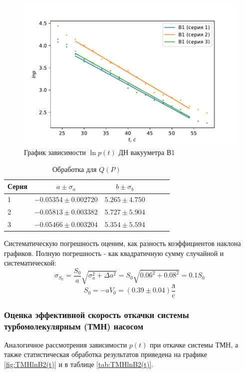 \documentclass[12pt,a4paper]{article}
\begin{document}
\begin{figure}[H]
	\centering
	\includegraphics[width = 11 cm]{res/lnB1(t).pdf}
	\caption{График зависимости $\ln{p}(t)$ ДН вакууметра В1}
	\label{fig:lnB1(t)}
\end{figure}
\begin{table}[H]
	
	\caption{Обработка для $Q(P)$}
	\label{tab:lnB1(t)_stat}
	\centering
	\footnotesize
	\begin{tabular}{lccccc}
		\toprule
		
		Серия & $a \pm \sigma_a$ & $b \pm \sigma_b$ \\
		\midrule
		1 & $-0.05354 \pm 0.002720$     &    $5.265 \pm 4.750$ \\ 
		2 & $-0.05813 \pm 0.003382$     &    $5.727 \pm 5.904$ \\
		3 & $-0.05466 \pm 0.003204$     &    $5.354 \pm 5.594$ \\ 
		\bottomrule
	\end{tabular}
\end{table}

Систематическую погрешность оценим, как разность коэффициентов наклона графиков. Полную погрешность - как квадратичную сумму случайной и систематической:
$$	\sigma_{S_0} = \frac{S_0}{a}\sqrt{\sigma_{a}^2 + \Delta a^2} = S_0 \sqrt{0.06^2 + 0.08^2} = 0.1 S_0$$
$$S_0 = -a V_0 = (0.39 \pm 0.04) \frac{\text{л}}{\text{c}}$$

\subsubsection*{Оценка эффективной скорость откачки системы турбомолекулярным (ТМН) насосом}
Аналогичное рассмотрения зависимости $p(t)$ при откачке системы ТМН, а также статистическая обработка результатов приведена на графике \ref{fig:TMHlnB2(t)} и в таблице \ref{tab:TMHlnB2(t)}. 
\end{document}
